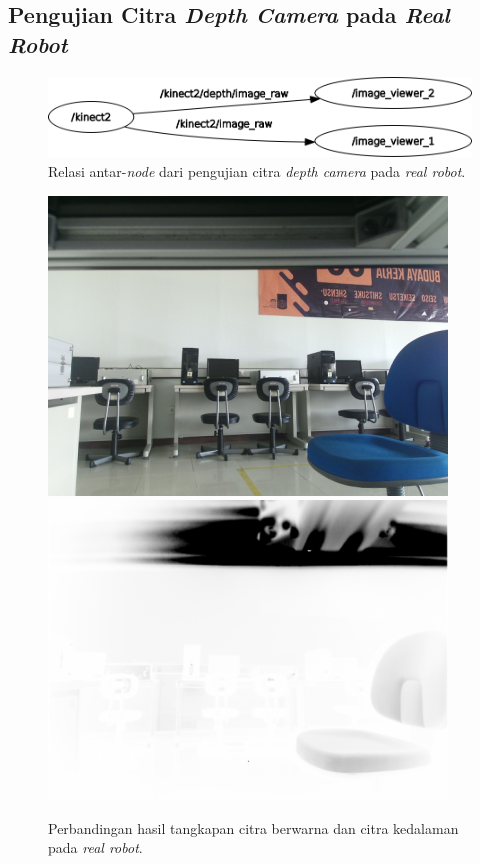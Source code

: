 \subsection{Pengujian Citra \emph{Depth Camera} pada \emph{Real Robot}}
\label{subsec:citradepthrobot}

\begin{figure}[ht]
  \centering
  \includegraphics[scale=0.35]{gambar/rosgraph-depth-camera.png}
  \caption{Relasi antar-\emph{node} dari pengujian citra \emph{depth camera} pada \emph{real robot}.}
  \label{fig:rosgraphdepthcamera}
\end{figure}

\textcolor{red}{\lipsum[1-2]}

\begin{figure}[ht]
  \centering
  \includegraphics[scale=0.25]{gambar/citra-depth-camera-rgb-robot.png}
  \includegraphics[scale=0.25]{gambar/citra-depth-camera-depth-robot.png}
  \caption{Perbandingan hasil tangkapan citra berwarna dan citra kedalaman pada \emph{real robot}.}
  \label{fig:depthcamerarobot}
\end{figure}
